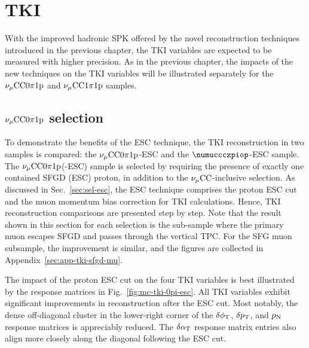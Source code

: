\section{TKI}
\label{sec:mc-tki}
     With the improved hadronic SPK offered by the novel reconstruction techniques introduced in the previous chapter, the TKI variables are expected to be measured with higher precision. As in the previous chapter, the impacts of the new techniques on the TKI variables will be illustrated separately for the $\nu_{\mu}\textrm{CC}0\pi1\textrm{p}$ and $\nu_{\mu}\textrm{CC}1\pi1\textrm{p}$ samples.

     \subsection{$\nu_{\mu}\textrm{CC}0\pi1\textrm{p}$ selection}
     \label{sec:mc-tki-0pi}
          To demonstrate the benefits of the ESC technique, the TKI reconstruction in two samples is compared: the $\nu_{\mu}\textrm{CC}0\pi1\textrm{p}$-ESC and the $\numuccczpiop$-ESC sample.
          The $\nu_{\mu}\textrm{CC}0\pi1\textrm{p}$(-ESC) sample is selected by requiring the presence of exactly one contained SFGD (ESC) proton, in addition to the $\nu_{\mu}\textrm{CC}$-inclusive selection.
          As discussed in Sec.~\ref{sec:sel-esc}, the ESC technique comprises the proton ESC cut and the muon momentum bias correction for TKI calculations.
          Hence, TKI reconstruction comparisons are presented step by step.
          Note that the result shown in this section for each selection is the sub-sample where the primary muon escapes SFGD and passes through the vertical TPC. 
          For the SFG muon subsample, the improvement is similar, and the figures are collected in Appendix~\ref{sec:app-tki-sfgd-mu}.

          The impact of the proton ESC cut on the four TKI variables is best illustrated by the response matrices in Fig.~\ref{fig:mc-tki-0pi-esc}.
          All TKI variables exhibit significant improvements in reconstruction after the ESC cut.
          Most notably, the dense off-diagonal cluster in the lower-right corner of the $\delta\phi_\textrm{T}$, $\delta p_\textrm{T}$, and $p_\textrm{N}$ response matrices is appreciably reduced.
          The $\delta\alpha_\textrm{T}$ response matrix entries also align more closely along the diagonal following the ESC cut.
          
